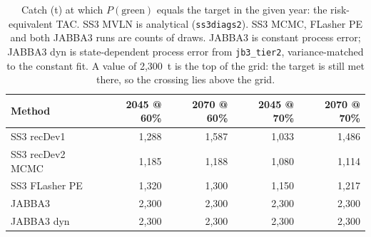 \begin{table}[htbp]

\caption{\label{tab:tac}Catch (t) at which $P(\mathrm{green})$ equals the target in the given year: the risk-equivalent TAC. SS3 MVLN is analytical (\texttt{ss3diags2}). SS3 MCMC, FLasher PE and both JABBA3 runs are counts of draws. JABBA3 is constant process error; JABBA3 dyn is state-dependent process error from \texttt{jb3\_tier2}, variance-matched to the constant fit. A value of 2{,}300~t is the top of the grid: the target is still met there, so the crossing lies above the grid.}
\centering
\begin{tabular}[t]{lrrrr}
\toprule
Method & 2045 @ 60\% & 2070 @ 60\% & 2045 @ 70\% & 2070 @ 70\%\\
\midrule
SS3 recDev1 & 1,288 & 1,587 & 1,033 & 1,486\\
SS3 recDev2 MCMC & 1,185 & 1,188 & 1,080 & 1,114\\
SS3 FLasher PE & 1,320 & 1,300 & 1,150 & 1,217\\
JABBA3 & 2,300 & 2,300 & 2,300 & 2,300\\
JABBA3 dyn & 2,300 & 2,300 & 2,300 & 2,300\\
\bottomrule
\end{tabular}
\end{table}
